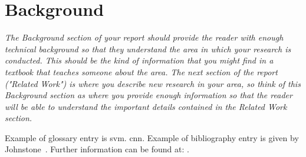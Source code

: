 \section{Background} 

\emph{The Background section of your report should provide the reader with enough technical background so that they understand the area in which your research is conducted. This should be the kind of information that you might find in a textbook that teaches someone about the area. The next section of the report ("Related Work") is where you describe new research in your area, so think of this Background section as where you provide enough information so that the reader will be able to understand the important details contained in the Related Work section.}

Example of glossary entry is \gls{svm}. \gls{cnn}.
Example of bibliography entry is given by Johnstone~\cite{Joh11}.
Further information can be found at: \cite{website:fermentas-lambda}.

